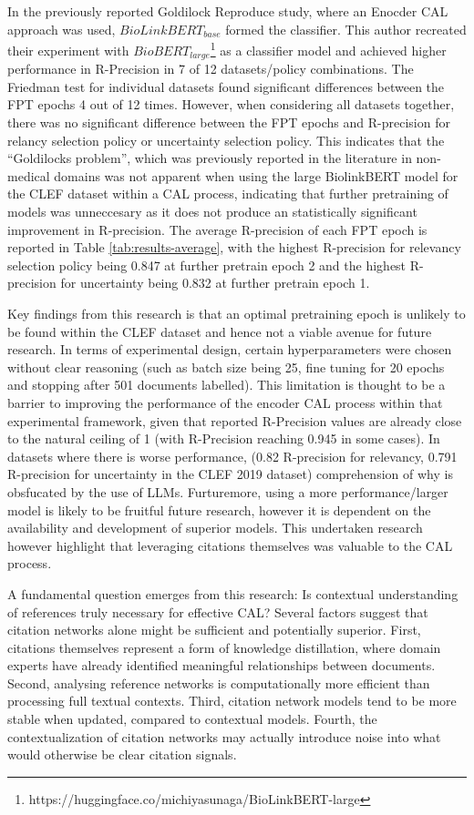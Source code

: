 \documentclass[../main.tex]{subfiles}
\begin{document}
In the previously reported Goldilock Reproduce study, where an Enocder CAL approach was used, $BioLinkBERT_{base}$ formed the classifier. This author recreated their experiment with $BioBERT_{large}$\footnote{https://huggingface.co/michiyasunaga/BioLinkBERT-large} as a classifier model and achieved higher performance in R-Precision in 7 of 12 datasets/policy combinations.  The Friedman test for individual datasets found significant differences between the FPT epochs 4 out of 12 times. However, when considering all datasets together, there was no significant difference between the FPT epochs and R-precision for relancy selection policy or uncertainty selection policy. This indicates that the ``Goldilocks problem'', which was previously reported in the literature in non-medical domains was not apparent when using the large BiolinkBERT model for the CLEF dataset within a CAL process, indicating that further pretraining of models was unneccesary as it does not produce an statistically significant improvement in R-precision. The average R-precision of each FPT epoch is reported in Table \ref{tab:results-average}, with the highest R-precision for relevancy selection policy being 0.847 at further pretrain epoch 2 and the highest R-precision for uncertainty being  0.832 at further pretrain epoch 1. 

Key findings from this research is that an optimal pretraining epoch is unlikely to be found within the CLEF dataset and hence not a viable avenue for future research. In terms of experimental design, certain hyperparameters were chosen without clear reasoning (such as batch size being 25, fine tuning for 20 epochs and stopping after 501 documents labelled). This limitation is thought to be a barrier to improving the performance of the encoder CAL process within that experimental framework, given that reported R-Precision values are already close to the natural ceiling of 1 (with R-Precision reaching 0.945 in some cases). In datasets where there is worse performance, (0.82 R-precision for relevancy, 0.791 R-precision for uncertainty in the CLEF 2019 dataset) comprehension of why is obsfucated by the use of LLMs. Furturemore, using a more performance/larger model is likely to be fruitful future research, however it is dependent on the availability and development of superior models. This undertaken research 
however highlight that leveraging citations themselves was valuable to the CAL process.

A fundamental question emerges from this research: Is contextual understanding of references truly necessary for effective CAL? Several factors suggest that citation networks alone might be sufficient and potentially superior. First, citations themselves represent a form of knowledge distillation, where domain experts have already identified meaningful relationships between documents. Second, analysing reference networks is computationally more efficient than processing full textual contexts. Third, citation network models tend to be more stable when updated, compared to contextual models. Fourth, the contextualization of citation networks may actually introduce noise into what would otherwise be clear citation signals.
\end{document}
